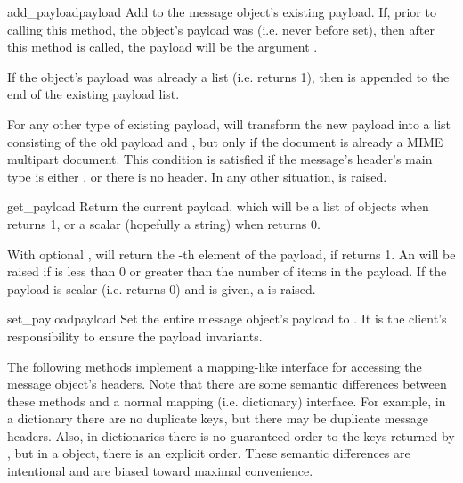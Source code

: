 \documentclass{howto}
\begin{document}
\begin{methoddesc}[Message]{add_payload}{payload}
Add  to the message object's existing payload.  If, prior
to calling this method, the object's payload was 
(i.e. never before set), then after this method is called, the payload
will be the argument .

If the object's payload was already a list
(i.e.  returns 1), then  is
appended to the end of the existing payload list.

For any other type of existing payload,  will
transform the new payload into a list consisting of the old payload
and , but only if the document is already a MIME
multipart document.  This condition is satisfied if the message's
 header's main type is either , or
there is no  header.  In any other situation,
 is raised.
\end{methoddesc}

\begin{methoddesc}[Message]{get_payload}{}
Return the current payload, which will be a list of 
objects when  returns 1, or a scalar (hopefully
a string) when  returns 0.

With optional ,  will return the
-th element of the payload, if  returns
1.  An  will be raised if  is less than 0 or
greater than the number of items in the payload.  If the payload is
scalar (i.e.  returns 0) and  is given, a
 is raised.
\end{methoddesc}

\begin{methoddesc}[Message]{set_payload}{payload}
Set the entire message object's payload to .  It is the
client's responsibility to ensure the payload invariants.
\end{methoddesc}

The following methods implement a mapping-like interface for accessing
the message object's  headers.  Note that there are some
semantic differences between these methods and a normal mapping
(i.e. dictionary) interface.  For example, in a dictionary there are
no duplicate keys, but there may be duplicate message headers.  Also,
in dictionaries there is no guaranteed order to the keys returned by
, but in a  object, there is an explicit
order.  These semantic differences are intentional and are biased
toward maximal convenience.
\end{document}
